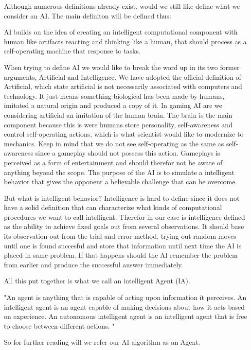 Although numerous definitions already exist, would we still like define what we consider an AI. The main definiton will be defined thus: 

 		AI builds on the idea of creating an intelligent computational component with human like artifacts 			reacting and thinking like a human, that should process as a self-operating machine that response to 		tasks. 

When trying to define AI we would like to break the word up in its two former arguments, Artificial and Intelligence. 
We have adopted the official definition of Artificial, which state artificial is not necessarily associated with computers and technology. It just means something biological has been made by humans, imitated a natural origin and produced a copy of it. 
In gaming AI are we considering artificial an imitation of the human brain. The brain is the main component because this is were humans store personality, self-awareness and control self-operating actions, which is what scientist would like to modernize to mechanics. 
Keep in mind that we do not see self-operating as the same as self-awareness since a gameplay should not possess this action. Gameplays is perceived as a form of entertainment and should therefor not be aware of anything beyond the scope. The purpose of the AI is to simulate a intelligent behavior that gives the opponent a believable challenge that can be overcome. 

But what is intelligent behavior? Intelligence is hard to define since it does not have a solid definition that can characterize what kinds of computational procedures we want to call intelligent. 
Therefor in our case is intelligence defined as the ability to achieve fixed goals out from several observations.
It should base its observation out from the trial and error method, trying out random moves until one is found succesful and store that information until next time the AI is placed in same problem. If that happens should the AI remember the problem from earlier and produce the successful answer immediately. 

All this put together is what we call an intelligent Agent (IA). 

"An agent is anything that is capable of acting upon information it perceives. An intelligent agent is an agent capable of making decisions about how it acts based on experience. An autonomous intelligent agent is an intelligent agent that is free to choose between different actions. "

So for further reading will we refer our AI algorithm as an Agent.  


